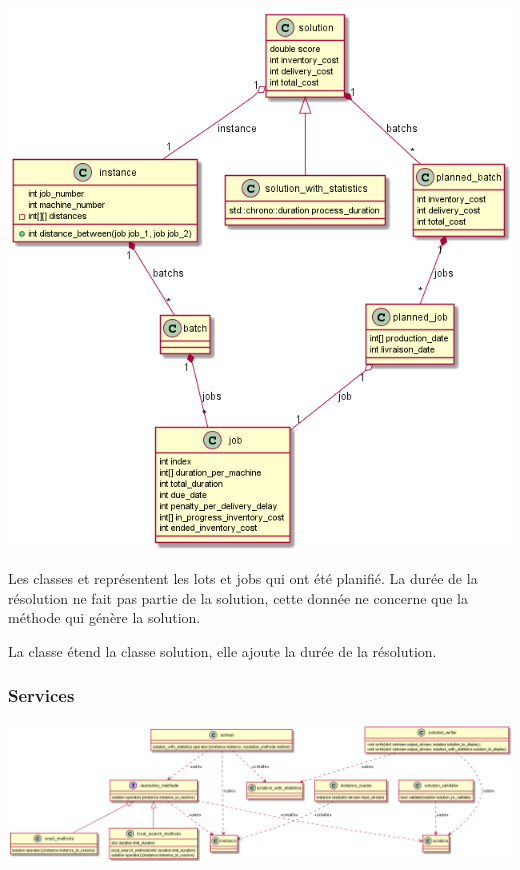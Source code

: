 \includegraphics[width=\textwidth]{parts/analyse_et_conception/diagramme_data}

Les classes  et  représentent les lots et jobs qui ont été planifié.
La durée de la résolution ne fait pas partie de la solution,  cette donnée ne concerne que la méthode qui génère la solution.

La classe  étend la classe solution, 
elle ajoute la durée de la résolution.

\subsubsection{Services}

\includegraphics[width=\textwidth]{parts/analyse_et_conception/services}



